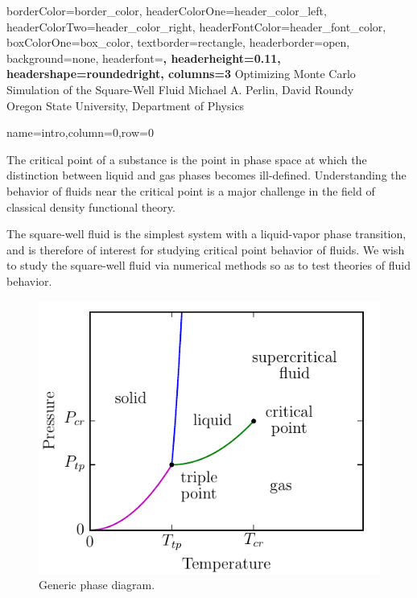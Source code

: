 \documentclass[paperwidth=48in,paperheight=36in,
fontscale=0.27,margin=0.75in]{baposter}
\renewcommand{\title}{Optimizing Monte Carlo Simulation of the
  Square-Well Fluid}
\renewcommand{\author}{\LARGE Michael A. Perlin, David Roundy}
\newcommand{\location}{Oregon State University, Department of Physics}
\begin{document}
\begin{poster}{
    borderColor=border_color, %
    headerColorOne=header_color_left, %
    headerColorTwo=header_color_right, %
    headerFontColor=header_font_color, %
    boxColorOne=box_color, %
    textborder=rectangle, %
    headerborder=open, %
    background=none, %
    headerfont=\Large\sf\bf, %
    headerheight=0.11\textheight, %
    headershape=roundedright, %
    columns=3 %
  }%
  {%
  }%
  {%
    \LARGE\title
  }%
  {%
    \Large\author \\[1mm]
    \location
  }%
  {%
  }%

  {name=intro,column=0,row=0}{%

    The critical point of a substance is the point in phase space at
    which the distinction between liquid and gas phases becomes
    ill-defined. Understanding the behavior of fluids near the
    critical point is a major challenge in the field of classical
    density functional theory.

    \vspace{6pt}

    The square-well fluid is the simplest system with a liquid-vapor
    phase transition, and is therefore of interest for studying
    critical point behavior of fluids. We wish to study the
    square-well fluid via numerical methods so as to test theories of
    fluid behavior.

    \begin{figure}[H]
      \centering
      \includegraphics[width=0.5\columnwidth]{figs/phase-diagram.pdf}
      \caption{Generic phase diagram.}
      \label{fig:phase_diagram}
    \end{figure}

  }


\end{poster}
\end{document}
